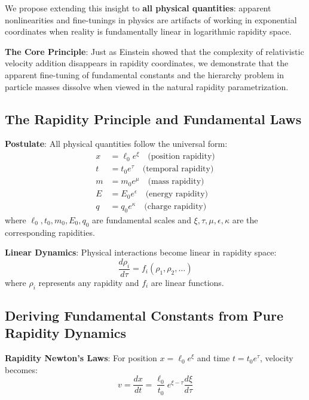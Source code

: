 \documentclass[12pt,a4paper]{article}
\begin{document}
We propose extending this insight to \textbf{all physical quantities}: apparent nonlinearities and fine-tunings in physics are artifacts of working in exponential coordinates when reality is fundamentally linear in logarithmic rapidity space.

\textbf{The Core Principle}: Just as Einstein showed that the complexity of relativistic velocity addition disappears in rapidity coordinates, we demonstrate that the apparent fine-tuning of fundamental constants and the hierarchy problem in particle masses dissolve when viewed in the natural rapidity parametrization.

\subsection{The Rapidity Principle and Fundamental Laws}

\textbf{Postulate}: All physical quantities follow the universal form:
\begin{align}
x &= \ell_0 e^{\xi} \quad \text{(position rapidity)} \\
t &= t_0 e^{\tau} \quad \text{(temporal rapidity)} \\
m &= m_0 e^{\mu} \quad \text{(mass rapidity)} \\
E &= E_0 e^{\epsilon} \quad \text{(energy rapidity)} \\
q &= q_0 e^{\kappa} \quad \text{(charge rapidity)}
\end{align}
where $\ell_0, t_0, m_0, E_0, q_0$ are fundamental scales and $\xi, \tau, \mu, \epsilon, \kappa$ are the corresponding rapidities.

\textbf{Linear Dynamics}: Physical interactions become linear in rapidity space:
\begin{equation}
\frac{d\rho_i}{d\tau} = f_i(\rho_1, \rho_2, \ldots)
\end{equation}
where $\rho_i$ represents any rapidity and $f_i$ are linear functions.

\subsection{Deriving Fundamental Constants from Pure Rapidity Dynamics}

\textbf{Rapidity Newton's Laws}:
For position $x = \ell_0 e^{\xi}$ and time $t = t_0 e^{\tau}$, velocity becomes:
\begin{equation}
v = \frac{dx}{dt} = \frac{\ell_0}{t_0} e^{\xi-\tau} \frac{d\xi}{d\tau}
\end{equation}
\end{document}
